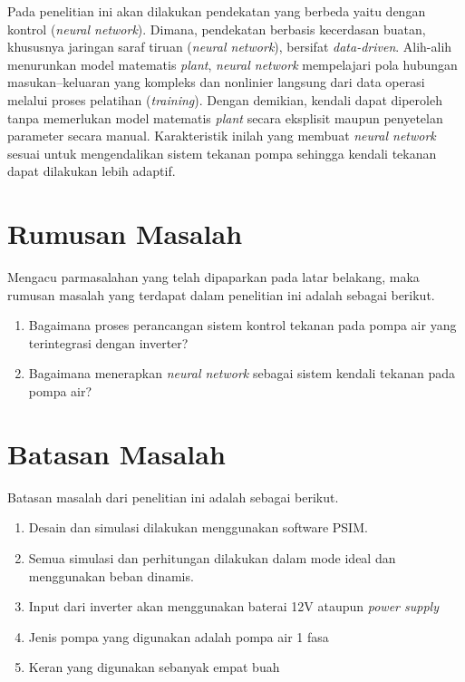 Pada penelitian ini akan dilakukan pendekatan yang berbeda yaitu dengan kontrol (\emph{neural network}).
Dimana, pendekatan berbasis kecerdasan buatan, khususnya jaringan saraf
tiruan (\emph{neural network}), bersifat \emph{data-driven}. Alih-alih menurunkan
model matematis \emph{plant}, \emph{neural network} mempelajari pola hubungan
masukan--keluaran yang kompleks dan nonlinier langsung dari data operasi melalui
proses pelatihan (\emph{training}). Dengan demikian, kendali dapat diperoleh tanpa
memerlukan model matematis \emph{plant} secara eksplisit maupun penyetelan
parameter secara manual. Karakteristik inilah yang membuat \emph{neural network}
sesuai untuk mengendalikan sistem tekanan pompa sehingga kendali tekanan dapat
dilakukan lebih adaptif.

\section{Rumusan Masalah}
Mengacu parmasalahan yang telah dipaparkan pada latar belakang, 
maka rumusan masalah yang terdapat dalam
penelitian ini adalah sebagai berikut.
\begin{enumerate}
    \item Bagaimana proses perancangan sistem kontrol tekanan pada pompa air yang terintegrasi dengan inverter?
    \item Bagaimana menerapkan \emph{neural network} sebagai sistem kendali tekanan pada pompa air?
    \end{enumerate}
    
\section{Batasan Masalah}

Batasan masalah dari penelitian ini adalah sebagai berikut.
\begin{enumerate}
    \item Desain dan simulasi dilakukan menggunakan software PSIM.
    \item Semua simulasi dan perhitungan dilakukan dalam mode ideal dan menggunakan beban dinamis. 
    \item Input dari inverter akan menggunakan baterai 12V ataupun \emph{power supply}
    \item Jenis pompa yang digunakan adalah pompa air 1 fasa
    \item Keran yang digunakan sebanyak empat buah
    \end{enumerate}

